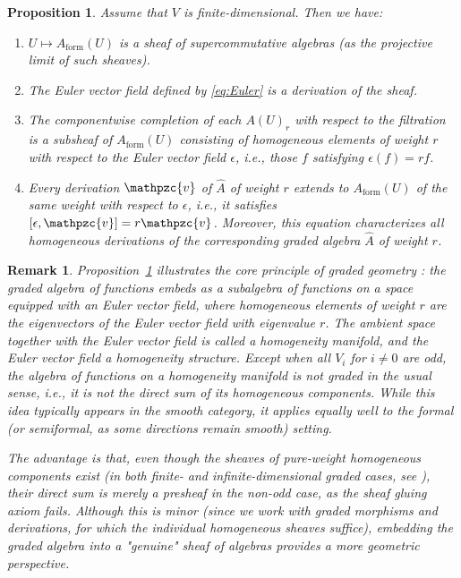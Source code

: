 \documentclass[a4paper,12pt]{amsart}
\newtheorem{proposition}{Proposition}
\newtheorem{rem}{Remark}
\newcommand{\cv}{\mathpzc{v}}
\def\e{\epsilon}
\begin{document}
\begin{proposition}\label{prop:graded_inside_formal}\normalfont
    Assume that $V$ is finite-dimensional. Then we have:
\begin{enumerate}
\item $U \mapsto A_{\mathrm{form}}(U)$ is a sheaf of supercommutative algebras (as the projective limit of such sheaves).
\smallskip
\item The Euler vector field defined by \eqref{eq:Euler} is a derivation of the sheaf.
\smallskip
\item The componentwise completion of each $A(U)_r$ with respect to the filtration is a subsheaf of $A_{\mathrm{form}}(U)$ consisting of homogeneous elements of weight $r$ with respect to the Euler vector field ${\e}$, i.e., those $f$ satisfying ${\e}(f) = r f$.
\smallskip
\item Every derivation $\cv$ of $\hat{A}$ of weight $r$ extends to $A_{\mathrm{form}}(U)$ of the same weight with respect to ${\e}$, i.e., it satisfies $[{\e}, \cv] = r \cv$. Moreover, this equation characterizes all homogeneous derivations of the corresponding graded algebra $\hat{A}$ of weight $r$.
\end{enumerate}
\end{proposition}

\begin{rem}\label{rem:formal_homogeneity_philosophy}\normalfont
    Proposition~\ref{prop:graded_inside_formal} illustrates the core principle of graded geometry \cite{grab-hom, GrabowskaGrabowski2024, Voronov2002}: the graded algebra of functions embeds as a subalgebra of functions on a space equipped with an Euler vector field, where homogeneous elements of weight $r$ are the eigenvectors of the Euler vector field with eigenvalue $r$. The ambient space together with the Euler vector field is called a \emph{homogeneity manifold}, and the Euler vector field a \emph{homogeneity structure}. Except when all $V_i$ for $i\neq 0$ are odd, the algebra of functions on a homogeneity manifold is not graded in the usual sense, i.e., it is not the direct sum of its homogeneous components. While this idea typically appears in the smooth category, it applies equally well to the formal (or semiformal, as some directions remain smooth) setting.

\smallskip\noindent
The advantage is that, even though the sheaves of pure-weight homogeneous components exist (in both finite- and infinite-dimensional graded cases, see \cite{KS2024}), their direct sum is merely a presheaf in the non-odd case, as the sheaf gluing axiom fails. Although this is minor (since we work with graded morphisms and derivations, for which the individual homogeneous sheaves suffice), embedding the graded algebra into a "genuine" sheaf of algebras provides a more geometric perspective.
\end{rem}
\end{document}
